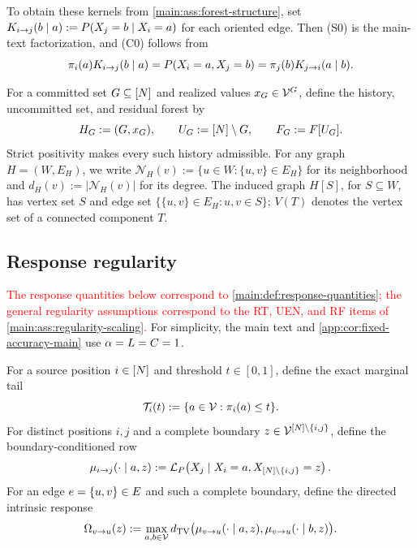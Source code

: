 To obtain these kernels from \cref{main:ass:forest-structure}, set
$K_{i\to j}(b\mid a):=P(X_j=b\mid X_i=a)$
for each oriented edge. Then (S0) is the main-text factorization, and
(C0) follows from
\[
 \pi_{i}(a)K_{i\to j}(b\mid a)
 =P(X_i=a,X_j=b)
 =\pi_{j}(b)K_{j\to i}(a\mid b).
\]

For a committed set $G\subseteq[N]$ and realized values
$x_G\in\mathcal V^G$, define the history, uncommitted set, and residual
forest by
\begin{equation}
 H_{G}:=(G,x_G),
 \qquad
 U_{G}:=[N]\setminus G,
 \qquad
 F_{G}:=F[U_{G}].
 \label{app:eq:history}
\end{equation}
Strict positivity makes every such history admissible.
For any graph $H=(W,E_H)$, we write
$\mathcal N_H(v):=\{u\in W:\{u,v\}\in E_H\}$ for its neighborhood and
$d_H(v):=|\mathcal N_H(v)|$ for its degree.  The induced graph $H[S]$,
for $S\subseteq W$, has vertex set $S$ and edge set
$\{\{u,v\}\in E_H:u,v\in S\}$; $V(T)$ denotes the vertex set of a
connected component $T$.

\subsection{Response regularity}
\label{app:setup-response}

\textcolor{red}{The response quantities below correspond to
\cref{main:def:response-quantities}; the general regularity assumptions
correspond to the RT, UEN, and RF items of
\cref{main:ass:regularity-scaling}.}
For simplicity, the main text and \cref{app:cor:fixed-accuracy-main}
use $\alpha=L=C=1$.

\begin{definition}
\label{app:def:response-quantities}
For a source position $i\in[N]$ and threshold $t\in[0,1]$, define the exact
marginal tail
\begin{equation}
 \mathcal T_{i}(t)
 :=\{a\in\mathcal V:\pi_{i}(a)\le t\}.
 \label{app:eq:tail}
\end{equation}
For distinct positions $i,j$ and a complete boundary
$z\in\mathcal V^{[N]\setminus\{i,j\}}$, define the boundary-conditioned
row
\begin{equation}
 \mu_{i\to j}(\cdot\mid a,z)
 :=\mathcal L_{P}\!\left(
 X_j\mid X_i=a,
 X_{[N]\setminus\{i,j\}}=z
 \right).
 \label{app:eq:boundary-row}
\end{equation}
For an edge $e=\{u,v\}\in E$ and such a complete boundary, define
the directed intrinsic response
\begin{equation}
 \Omega_{v\to u}(z)
 :=\max_{a,b\in\mathcal V}
 d_{\mathrm{TV}}\bigl(
 \mu_{v\to u}(\cdot\mid a,z),
 \mu_{v\to u}(\cdot\mid b,z)
 \bigr).
 \label{app:eq:intrinsic-response}
\end{equation}
\end{definition}

